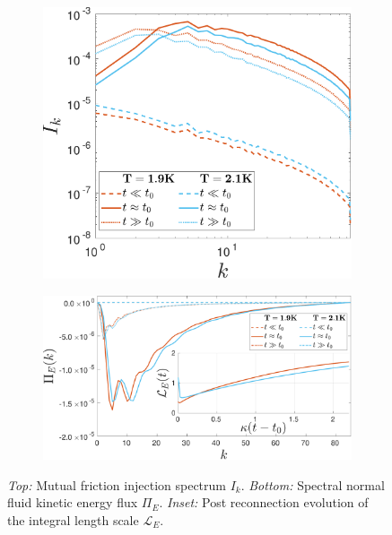 \documentclass[%
 reprint,
 amsmath,amssymb,
 aps,
 prl,
]{revtex4-2}
\begin{document}
\begin{figure}[t]
    \centering
    \begin{subfigure}[b]{0.48\textwidth}
        \centering
        \includegraphics*[width=\textwidth]{inj-spec.pdf}
        \caption{}
        \label{fig:injection-spec}
    \end{subfigure}
 
    \begin{subfigure}[b]{0.48\textwidth}
    \centering
    \includegraphics*[width=\textwidth]{flux-spec.pdf}
    \caption{}
    \label{fig:energy-flux}
    \end{subfigure}
\hfill

\caption{\emph{Top:} Mutual friction injection spectrum $I_k$. \emph{Bottom:} Spectral normal fluid kinetic energy flux $\Pi_E$. \emph{Inset:} Post reconnection evolution of the integral length scale $\mathcal{L}_E$.}
\end{figure}
\end{document}
